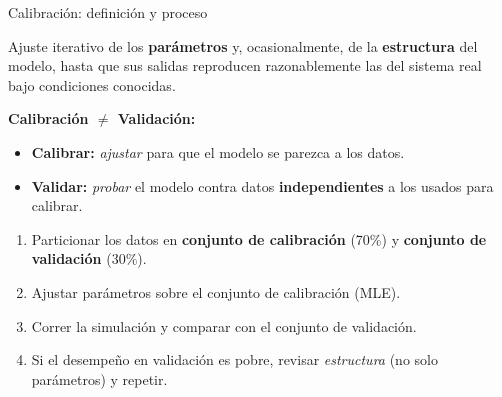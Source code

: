 \documentclass[aspectratio=1610, 10pt]{beamer}
\begin{document}
\begin{frame}{Calibración: definición y proceso}
  \begin{definicionbox}[Calibración]
    \footnotesize
    Ajuste iterativo de los \textbf{parámetros} y, ocasionalmente, de la
    \textbf{estructura} del modelo, hasta que sus salidas reproducen
    razonablemente las del sistema real bajo condiciones conocidas.
  \end{definicionbox}

  \vspace{4pt}
  \footnotesize
  \textbf{Calibración $\neq$ Validación:}
  \begin{itemize}\itemsep1pt
    \item \textbf{Calibrar:} \emph{ajustar} para que el modelo se parezca a los datos.
    \item \textbf{Validar:} \emph{probar} el modelo contra datos
      \textbf{independientes} a los usados para calibrar.
  \end{itemize}

  \vspace{6pt}
  \begin{metodobox}
    \footnotesize
    \begin{enumerate}\itemsep1pt
      \item Particionar los datos en \textbf{conjunto de calibración} (70\%) y
        \textbf{conjunto de validación} (30\%).
      \item Ajustar parámetros sobre el conjunto de calibración (MLE).
      \item Correr la simulación y comparar con el conjunto de validación.
      \item Si el desempeño en validación es pobre, revisar
        \emph{estructura} (no solo parámetros) y repetir.
    \end{enumerate}
  \end{metodobox}
\end{frame}
\end{document}
